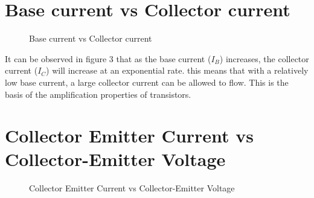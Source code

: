 \documentclass[a4paper,11pt]{article}
\begin{document}
\section{Base current vs Collector current}

\begin{figure}[h]
 \begin{center}
  \vspace{-8pt}
  \caption{Base current vs Collector current}
 \end{center}
\end{figure}

It can be observed in figure 3 that as the base current ($I_B$) increases, the collector current ($I_C$) will increase at an exponential rate. this means that with a relatively low base current, a large collector current can be allowed to flow. This is the basis of the amplification properties of transistors. 
\pagebreak

\section{Collector Emitter Current vs Collector-Emitter Voltage}

\begin{figure}[h]
 \begin{center}
  \vspace{-8pt}
  \caption{Collector Emitter Current vs Collector-Emitter Voltage}
 \end{center}
\end{figure}
\end{document}
